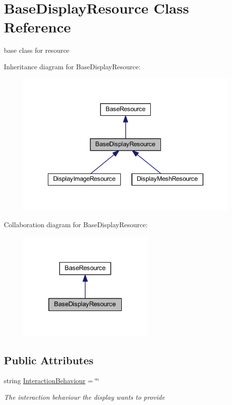 \hypertarget{class_base_display_resource}{}\section{Base\+Display\+Resource Class Reference}
\label{class_base_display_resource}


base class for resource  




Inheritance diagram for Base\+Display\+Resource\+:
\nopagebreak
\begin{figure}[H]
\begin{center}
\leavevmode
\includegraphics[width=328pt]{class_base_display_resource__inherit__graph}
\end{center}
\end{figure}


Collaboration diagram for Base\+Display\+Resource\+:
\nopagebreak
\begin{figure}[H]
\begin{center}
\leavevmode
\includegraphics[width=193pt]{class_base_display_resource__coll__graph}
\end{center}
\end{figure}
\subsection*{Public Attributes}
\begin{DoxyCompactItemize}
\item 
string \mbox{\hyperlink{class_base_display_resource_a076a3844786354934f897ff2e9b24a18}{Interaction\+Behaviour}} = \char`\"{}\char`\"{}
\begin{DoxyCompactList}\small\item\em The interaction behaviour the display wants to provide \end{DoxyCompactList}\end{DoxyCompactItemize}
